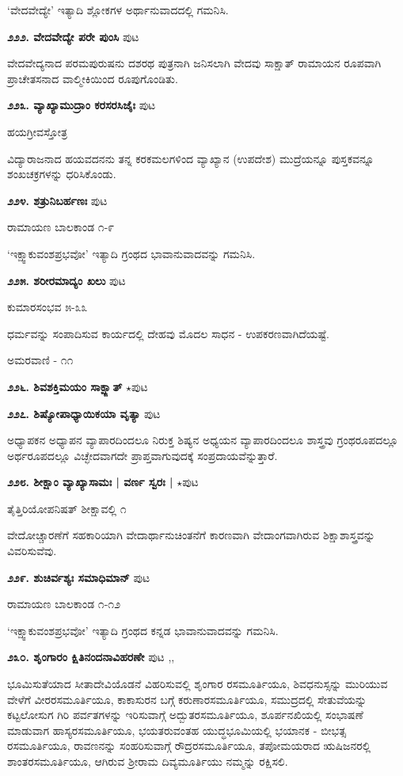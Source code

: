 `ವೇದವೇದ್ಯೇ' ಇತ್ಯಾದಿ ಶ್ಲೋಕಗಳ ಅರ್ಥಾನುವಾದದಲ್ಲಿ ಗಮನಿಸಿ.

\medskip
\noindent\textbf{೨೨೨. ವೇದವೇದ್ಯೇ ಪರೇ ಪುಂಸಿ} \hfill ಪುಟ \pageref{168c}

ವೇದವೇದ್ಯನಾದ ಪರಮಪುರುಷನು ದಶರಥ ಪುತ್ರನಾಗಿ ಜನಿಸಲಾಗಿ ವೇದವು ಸಾಕ್ಷಾತ್ ರಾಮಾಯನ ರೂಪವಾಗಿ ಪ್ರಾಚೇತಸನಾದ ವಾಲ್ಮೀಕಿಯಿಂದ ರೂಪುಗೊಂಡಿತು.

\medskip
\noindent\textbf{೨೨೩. ವ್ಯಾಖ್ಯಾಮುದ್ರಾಂ ಕರಸರಸಿಜೈಃ} \hfill ಪುಟ \pageref{100}

\hfill ಹಯಗ್ರೀವಸ್ತೋತ್ರ

ವಿದ್ಯಾರಾಜನಾದ ಹಯವದನನು ತನ್ನ ಕರಕಮಲಗಳಿಂದ ವ್ಯಾಖ್ಯಾನ (ಉಪದೇಶ) ಮುದ್ರೆಯನ್ನೂ ಪುಸ್ತಕವನ್ನೂ ಶಂಖಚಕ್ರಗಳನ್ನು ಧರಿಸಿಕೊಂಡು.
 
\medskip
\noindent\textbf{೨೨೪. ಶತ್ರುನಿಬರ್ಹಣಃ} \hfill ಪುಟ \pageref{250f}

\hfill ರಾಮಾಯಣ ಬಾಲಕಾಂಡ ೧-೯

`ಇಕ್ಷ್ವಾಕುವಂಶಪ್ರಭವೋ' ಇತ್ಯಾದಿ ಗ್ರಂಥದ ಭಾವಾನುವಾದವನ್ನು ಗಮನಿಸಿ.

\medskip
\noindent\textbf{೨೨೫. ಶರೀರಮಾದ್ಯಂ ಖಲು} \hfill ಪುಟ \pageref{76d}

\hfill ಕುಮಾರಸಂಭವ ೫-೩೩

ಧರ್ಮವನ್ನು ಸಂಪಾದಿಸುವ ಕಾರ್ಯದಲ್ಲಿ ದೇಹವು ಮೊದಲ ಸಾಧನ - ಉಪಕರಣವಾಗಿದೆಯಷ್ಟೆ. 

\hfill ಅಮರವಾಣಿ - ೧೧

\medskip
\noindent\textbf{೨೨೬. ಶಿವಶಕ್ತಿಮಯಂ ಸಾಕ್ಷ್ಜಾತ್} $\star$\hfill ಪುಟ \pageref{32b}

\medskip
\noindent\textbf{೨೨೭. ಶಿಷ್ಯೋಪಾಧ್ಯಾಯಿಕಯಾ ವೃತ್ಯಾ} \hfill ಪುಟ \pageref{45a}

ಅಧ್ಯಾಪಕನ ಅಧ್ಯಾಪನ ವ್ಯಾಪಾರದಿಂದಲೂ ನಿರುಕ್ತ ಶಿಷ್ಯನ ಅಧ್ಯಯನ ವ್ಯಾಪಾರದಿಂದಲೂ ಶಾಸ್ತ್ರವು ಗ್ರಂಥರೂಪದಲ್ಲೂ ಅರ್ಥರೂಪದಲ್ಲೂ ವಿಚ್ಛೇದವಾಗದೇ ಪ್ರಾಪ್ತವಾಗುವುದಕ್ಕೆ ಸಂಪ್ರದಾಯವೆನ್ನುತ್ತಾರೆ.

\medskip
\noindent\textbf{೨೨೮. ಶೀಕ್ಷಾಂ ವ್ಯಾಖ್ಯಾಸಾಮಃ | ವರ್ಣ ಸ್ವರಃ |} $\star$\hfill ಪುಟ \pageref{10a}

\hfill ತೈತ್ತಿರಿಯೋಪನಿಷತ್ ಶೀಕ್ಷಾವಲ್ಲಿ ೧

ವೇದೋಚ್ಚಾರಣೆಗೆ ಸಹಕಾರಿಯಾಗಿ ವೇದಾರ್ಥಾನುಚಿಂತನೆಗೆ ಕಾರಣವಾಗಿ ವೇದಾಂಗವಾಗಿರುವ ಶಿಕ್ಷಾಶಾಸ್ತ್ರವನ್ನು ವಿವರಿಸುವೆವು.

\medskip
\noindent\textbf{೨೨೯. ಶುಚಿರ್ವಶ್ಯಃ ಸಮಾಧಿಮಾನ್} \hfill ಪುಟ \pageref{255}

\hfill ರಾಮಾಯಣ ಬಾಲಕಾಂಡ ೧-೧೨

`ಇಕ್ಷ್ವಾಕುವಂಶಪ್ರಭವೋ' ಇತ್ಯಾದಿ ಗ್ರಂಥದ ಕನ್ನಡ ಭಾವಾನುವಾದವನ್ನು ಗಮನಿಸಿ.

\medskip
\noindent\textbf{೨೩೦. ಶೃಂಗಾರಂ ಕ್ಷಿತಿನಂದನಾವಿಹರಣೇ} \hfill ಪುಟ \pageref{182a},\pageref{208c},\pageref{219b}

ಭೂಮಿಸುತೆಯಾದ ಸೀತಾದೇವಿಯೊಡನೆ ವಿಹರಿಸುವಲ್ಲಿ ಶೃಂಗಾರ ರಸಮೂರ್ತಿಯೂ, ಶಿವಧನುಸ್ಸನ್ನು ಮುರಿಯುವ ವೇಳೆಗೆ ವೀರರಸಮೂರ್ತಿಯೂ, ಕಾಕಾಸುರನ ಬಗ್ಗೆ ಕರುಣಾರಸಮೂರ್ತಿಯೂ, ಸಮುದ್ರದಲ್ಲಿ ಸೇತುವೆಯನ್ನು ಕಟ್ಟಲೋಸುಗ ಗಿರಿ ಪರ್ವತಗಳನ್ನು ಇರಿಸುವಾಗ್ಗೆ ಅದ್ಬುತರಸಮೂರ್ತಿಯೂ, ಶೂರ್ಪನಖಿಯಲ್ಲಿ ಸಂಭಾಷಣೆ ಮಾಡುವಾಗ ಹಾಸ್ಯರಸಮೂರ್ತಿಯೂ, ಭಯತರುವಂತಹ ಯುದ್ಧಭೂಮಿಯಲ್ಲಿ ಭಯಾನಕ - ಬೀಭತ್ಸ ರಸಮೂರ್ತಿಯೂ, ರಾವಣನನ್ನು ಸಂಹರಿಸುವಾಗ್ಗೆ ರೌದ್ರರಸಮೂರ್ತಿಯೂ, ತಪೋಮಯರಾದ ಋಷಿಜನರಲ್ಲಿ ಶಾಂತರಸಮೂರ್ತಿಯೂ, ಆಗಿರುವ ಶ್ರೀರಾಮ ದಿವ್ಯಮೂರ್ತಿಯು ನಮ್ಮನ್ನು ರಕ್ಷಿಸಲಿ.

